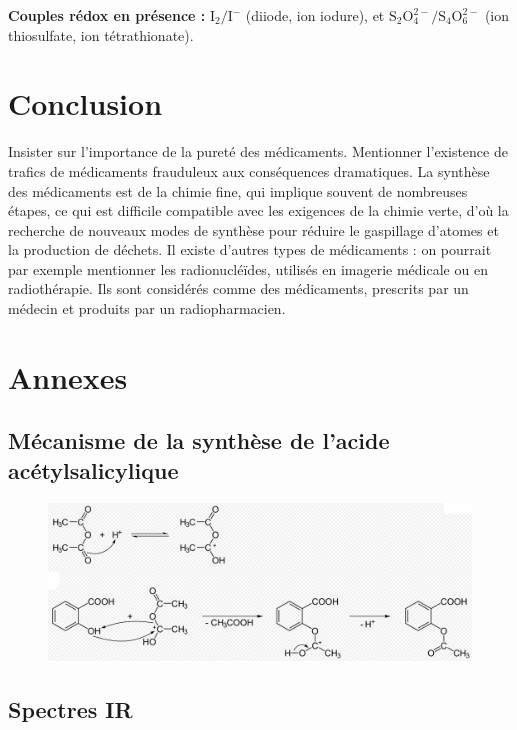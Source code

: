 \documentclass[11pt,a4paper]{report}
\begin{document}
\textbf{Couples rédox en présence :} $\text{I}_2/\text{I}^-$ (diiode, ion iodure), et 
$\text{S}_2\text{O}_4^{2-}/\text{S}_4\text{O}_6^{2-}$ (ion thiosulfate, ion tétrathionate).

\newpage
\section*{Conclusion}

Insister sur l'importance de la pureté des médicaments. Mentionner l'existence de trafics de médicaments frauduleux aux conséquences dramatiques. La synthèse des médicaments est de la chimie fine, qui implique souvent de nombreuses étapes, ce qui est difficile compatible avec les exigences de la chimie verte, d'où la recherche de nouveaux modes de synthèse pour réduire le gaspillage d'atomes et la production de déchets. Il existe d'autres types de médicaments : on pourrait par exemple mentionner les radionucléïdes, utilisés en imagerie médicale ou en radiothérapie. Ils sont considérés comme des médicaments, prescrits par un médecin et produits par un radiopharmacien.

\newpage
\section*{Annexes}
\subsection*{Mécanisme de la synthèse de l'acide acétylsalicylique}

\begin{figure}[h!]
\begin{center}
	\includegraphics[scale = 0.35]{mecanisme_synth.png}
	\label{fig:mecanisme}
\end{center}
\end{figure}

\newpage
\subsection*{Spectres IR}
\end{document}
